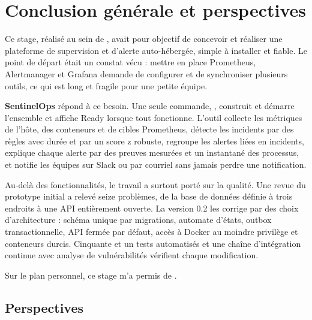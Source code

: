 \chapter*{Conclusion générale et perspectives}

Ce stage, réalisé au sein de \textbf{\entreprise}, avait pour objectif de concevoir et réaliser
une plateforme de supervision et d'alerte auto-hébergée, simple à installer et fiable. Le point
de départ était un constat vécu : mettre en place Prometheus, Alertmanager et Grafana demande
de configurer et de synchroniser plusieurs outils, ce qui est long et fragile pour une petite
équipe.

\textbf{SentinelOps} répond à ce besoin. Une seule commande, , construit et démarre
l'ensemble et affiche \og Ready \fg{} lorsque tout fonctionne. L'outil collecte les métriques de
l'hôte, des conteneurs et de cibles Prometheus, détecte les incidents par des règles avec durée
et par un score z robuste, regroupe les alertes liées en incidents, explique chaque alerte par
des preuves mesurées et un instantané des processus, et notifie les équipes sur Slack ou par
courriel sans jamais perdre une notification.

Au-delà des fonctionnalités, le travail a surtout porté sur la qualité. Une revue du prototype
initial a relevé seize problèmes, de la base de données définie à trois endroits à une API
entièrement ouverte. La version 0.2 les corrige par des choix d'architecture : schéma unique par
migrations, automate d'états, outbox transactionnelle, API fermée par défaut, accès à Docker au
moindre privilège et conteneurs durcis. Cinquante et un tests automatisés et une chaîne
d'intégration continue avec analyse de vulnérabilités vérifient chaque modification.

Sur le plan personnel, ce stage m'a permis de .

\section*{Perspectives}

